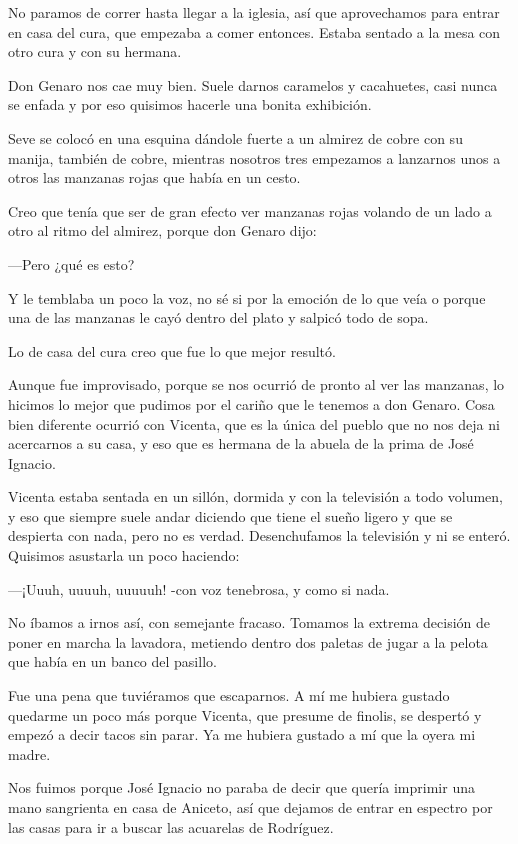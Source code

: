 \documentclass{barcodevapor3pags}
\begin{document}
No paramos de correr hasta llegar a la iglesia, así que aprovechamos
para entrar en casa del cura, que empezaba a comer entonces. Estaba
sentado a la mesa con otro cura y con su hermana.~

Don Genaro nos cae muy bien. Suele darnos caramelos y cacahuetes, casi
nunca se enfada y por eso quisimos hacerle una bonita exhibición.~

Seve se colocó en una esquina dándole fuerte a un almirez de cobre con
su manija, también de cobre, mientras nosotros tres empezamos a
lanzarnos unos a otros las manzanas rojas que había en un cesto.~

Creo que tenía que ser de gran efecto ver manzanas rojas volando de un
lado a otro al ritmo del almirez, porque don Genaro dijo:~

---Pero ¿qué es esto?~

Y le temblaba un poco la voz, no sé si por la emoción de lo que veía o
porque una de las manzanas le cayó dentro del plato y salpicó todo de
sopa.~

Lo de casa del cura creo que fue lo que mejor resultó.~

Aunque fue improvisado, porque se nos ocurrió de pronto al ver las
manzanas, lo hicimos lo mejor que pudimos por el cariño que le tenemos a
don Genaro. Cosa bien diferente ocurrió con Vicenta, que es la única del
pueblo que no nos deja ni acercarnos a su casa, y eso que es hermana de
la abuela de la prima de José Ignacio.~

Vicenta estaba sentada en un sillón, dormida y con la televisión a todo
volumen, y eso que siempre suele andar diciendo que tiene el sueño
ligero y que se despierta con nada, pero no es verdad. Desenchufamos la
televisión y ni se enteró. Quisimos asustarla un poco haciendo:~

---¡Uuuh, uuuuh, uuuuuh! -con voz tenebrosa, y como si nada.~

No íbamos a irnos así, con semejante fracaso. Tomamos la extrema
decisión de poner en marcha la lavadora, metiendo dentro dos paletas de
jugar a la pelota que había en un banco del pasillo.~

Fue una pena que tuviéramos que escaparnos. A mí me hubiera gustado
quedarme un poco más porque Vicenta, que presume de finolis, se despertó
y empezó a decir tacos sin parar. Ya me hubiera gustado a mí que la
oyera mi madre.~

Nos fuimos porque José Ignacio no paraba de decir que quería imprimir
una mano sangrienta en casa de Aniceto, así que dejamos de entrar en
espectro por las casas para ir a buscar las acuarelas de Rodríguez.~
\end{document}
